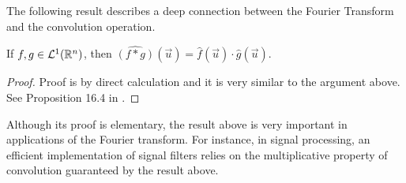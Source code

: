 The following result describes a deep connection between the Fourier Transform and the convolution operation.
\begin{theorem}
If $f, g \in {\mathcal {L}^1}({\mathbb R}^n)$, then $\widehat{(f \ast g)}(\vec{u}) = \widehat{f}(\vec{u}) \cdot \widehat{g}(\vec{u})$. 
\end{theorem}
\begin{proof} Proof is by direct calculation and it is very similar to the argument above. See Proposition 16.4 in \cite{bass2011real}.
\end{proof}

Although its proof is elementary, the result above is very important in applications of the Fourier transform. For instance, in signal processing, an efficient implementation of signal filters relies on the multiplicative property of convolution guaranteed by the result above.